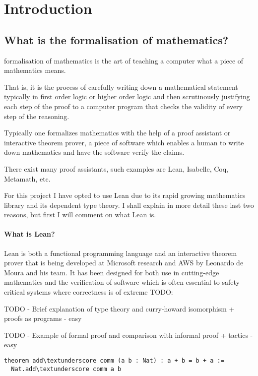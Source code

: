 \chapter{Introduction}\label{Ch2_Introduction}

\section{What is the formalisation of mathematics?}

formalisation of mathematics is the art of teaching a computer what a piece of mathematics means.

That is, it is the process of carefully writing down a mathematical statement typically in first order logic or higher order logic and then scrutinously justifying each step of the proof to a computer program that checks the validity of every step of the reasoning. 

Typically one formalizes mathematics with the help of a proof assistant or interactive theorem prover, a piece of software which enables a human to write down mathematics and have the software verify the claims.

There exist many proof assistants, such examples are Lean, Isabelle, Coq, Metamath, etc.

For this project I have opted to use Lean due to its rapid growing mathematics library and its dependent type theory. I shall explain in more detail these last two reasons, but first I will comment on what Lean is.

\subsubsection{What is Lean?}

Lean is both a functional programming language and an interactive theorem prover that is being developed at Microsoft research and AWS by Leonardo de Moura and his team.
It has been designed for both use in cutting-edge mathematics and the verification of software which is often essential to safety critical systems where correctness is of extreme
TODO:


TODO - Brief explanation of type theory and curry-howard isomorphism + proofs as programs - easy


TODO - Example of formal proof and comparison with informal proof + tactics - easy


\begin{verbatim}
theorem add\textunderscore comm (a b : Nat) : a + b = b + a :=
  Nat.add\textunderscore comm a b
\end{verbatim}



